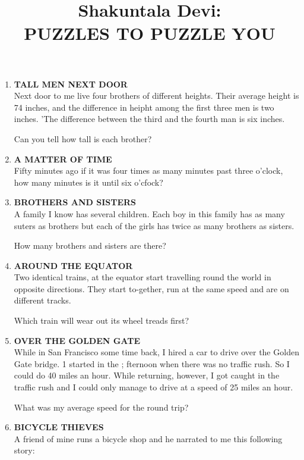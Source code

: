 \documentclass[12pt]{article}
\title{Shakuntala Devi: \\
PUZZLES TO PUZZLE YOU}
\author{}
\date{}
\begin{document}
\maketitle

\begin{enumerate}

\item \textbf{TALL  MEN  NEXT  DOOR} \\
Next  door  to me live four  brothers  of different  heights. Their  average  height  is 74 inches,  and the difference  in heipht  among  the  first  three  men  is two  inches. 'The difference  between  the  third  and  the  fourth  man  is six inches. 

Can you tell how  tall is each  brother? 

%
%
\item  \textbf {A  MATTER  OF  TIME} \\
Fifty  minutes  ago if it was  four  times  as many  minutes past three  o'clock,  how  many  minutes  is it until  six o'cfock? 

%
%
\item  \textbf {BROTHERS  AND  SISTERS} \\
A family  I know  has  several  children.  Each  boy  in this family  has  as many  suters  as brothers  but each  of the girls  has twice  as many  brothers  as sisters. 

How  many  brothers  and sisters  are there?

%
%
\item \textbf{AROUND  THE  EQUATOR} \\
Two identical  trains,  at the  equator  start  travelling round  the  world  in opposite  directions.  They  start  to-gether,  run  at the  same  speed  and  are  on  different tracks. 

Which  train  will  wear  out its wheel  treads  first? 

%
\item \textbf{OVER  THE  GOLDEN  GATE} \\
While  in San  Francisco  some  time  back,  I hired  a car to drive  over  the  Golden  Gate  bridge.  1 started  in the ; fternoon  when  there  was  no traffic  rush.  So  I could  do 40 miles  an hour.  While  returning,  however, I got caught  in the traffic  rush  and  I could  only  manage to drive  at a speed  of 25 miles  an hour. 

What  was  my average  speed  for the round  trip? 

%
\item  \textbf{BICYCLE  THIEVES} \\
A friend  of mine  runs  a bicycle  shop  and he narrated to me this following  story: 


\end{enumerate}
\end{document}
